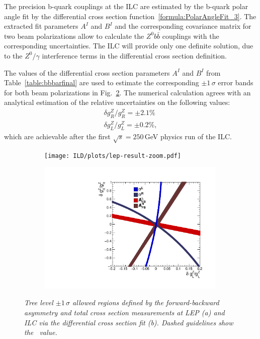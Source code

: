 The precision b-quark couplings at the ILC are estimated by the b-quark polar angle fit by the differential cross section function~\ref{formula:PolarAngleFit_3}.
The extracted fit parameters $A^I$ and $B^I$ and the corresponding covariance matrix for two beam polarizations allow to calculate the $Z^0b\bar{b}$ couplings with the corresponding uncertainties. 
The ILC will provide only one definite solution, due to the $Z^0/\gamma$ interference terms in the differential cross section definition. 

The values of the differential cross section parameters $A^I$ and $B^I$ from Table~\ref{table:bbbarfinal} are used to estimate the corresponding $\pm1\,\sigma$ error bands for both beam polarizations in Fig.~\ref{fig:LEPILCResult_b_3}.
The numerical calculation agrees with an analytical estimation of the relative uncertainties on the following values:
\begin{eqnarray}
	\delta g_R^Z / g_R^Z = \pm 2.1\% \label{formula:ILCgR} \\
	\delta  g_L^Z / g_L^Z = \pm 0.2\%,
\end{eqnarray}
which are achievable after the first $\sqrt{s} = 250$\,GeV physics run of the ILC. 


\begin{figure}
	\centering
	\begin{subfigure}{0.5\textwidth}
		\texttt{[image: ILD/plots/lep-result-zoom.pdf]}
		\caption{\label{fig:LEPILCResult_a_3} }
	\end{subfigure}%
	\begin{subfigure}{0.5\textwidth}
		\centering
		\includegraphics[width=0.99\textwidth]{ILD/plots/ilc-result.pdf}
		\caption{\label{fig:LEPILCResult_b_3} }
	\end{subfigure}
	\caption{\sl Tree level $\pm 1\,\sigma$ allowed regions defined by the forward-backward asymmetry and total cross section measurements at LEP (a) and ILC via the differential cross section fit (b). Dashed guidelines show the \sm\ value.}
	\label{fig:LEPILCResult_3}
\end{figure}


